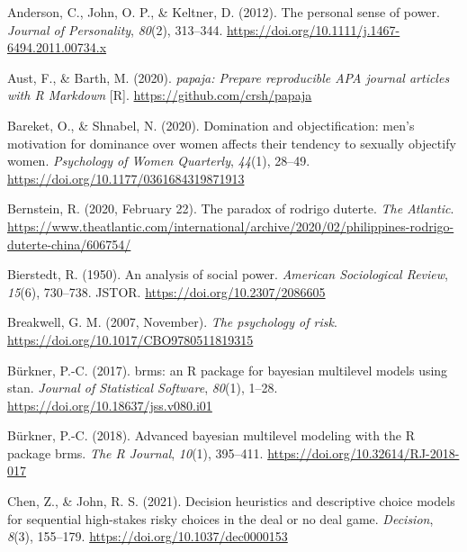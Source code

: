 \documentclass[
  donotrepeattitle,doc, 12pt, a4paper,floatsintext]{apa7}
\newlength{\cslhangindent}
\newlength{\cslentryspacingunit} %
\newenvironment{CSLReferences}[2] %
 {%
  \setlength{\parindent}{0pt}
  \ifodd #1
  \let\oldpar\par
  \def\par{\hangindent=\cslhangindent\oldpar}
  \fi
  \setlength{\parskip}{#2\cslentryspacingunit}
 }%
 {}
\begin{document}
\hypertarget{refs}{}
\begin{CSLReferences}{1}{0}
\leavevmode{}%
Anderson, C., John, O. P., \& Keltner, D. (2012). The personal sense of power. \emph{Journal of Personality}, \emph{80}(2), 313--344. \url{https://doi.org/10.1111/j.1467-6494.2011.00734.x}

\leavevmode{}%
Aust, F., \& Barth, M. (2020). \emph{papaja: Prepare reproducible APA journal articles with R Markdown} {[}R{]}. \url{https://github.com/crsh/papaja}

\leavevmode{}%
Bareket, O., \& Shnabel, N. (2020). Domination and objectification: men's motivation for dominance over women affects their tendency to sexually objectify women. \emph{Psychology of Women Quarterly}, \emph{44}(1), 28--49. \url{https://doi.org/10.1177/0361684319871913}

\leavevmode{}%
Bernstein, R. (2020, February 22). The paradox of rodrigo duterte. \emph{The Atlantic}. \url{https://www.theatlantic.com/international/archive/2020/02/philippines-rodrigo-duterte-china/606754/}

\leavevmode{}%
Bierstedt, R. (1950). An analysis of social power. \emph{American Sociological Review}, \emph{15}(6), 730--738. JSTOR. \url{https://doi.org/10.2307/2086605}

\leavevmode{}%
Breakwell, G. M. (2007, November). \emph{The psychology of risk}. \url{https://doi.org/10.1017/CBO9780511819315}

\leavevmode{}%
Bürkner, P.-C. (2017). brms: an R package for bayesian multilevel models using stan. \emph{Journal of Statistical Software}, \emph{80}(1), 1--28. \url{https://doi.org/10.18637/jss.v080.i01}

\leavevmode{}%
Bürkner, P.-C. (2018). Advanced bayesian multilevel modeling with the R package brms. \emph{The R Journal}, \emph{10}(1), 395--411. \url{https://doi.org/10.32614/RJ-2018-017}

\leavevmode{}%
Chen, Z., \& John, R. S. (2021). Decision heuristics and descriptive choice models for sequential high-stakes risky choices in the deal or no deal game. \emph{Decision}, \emph{8}(3), 155--179. \url{https://doi.org/10.1037/dec0000153}


\end{CSLReferences}
\end{document}
